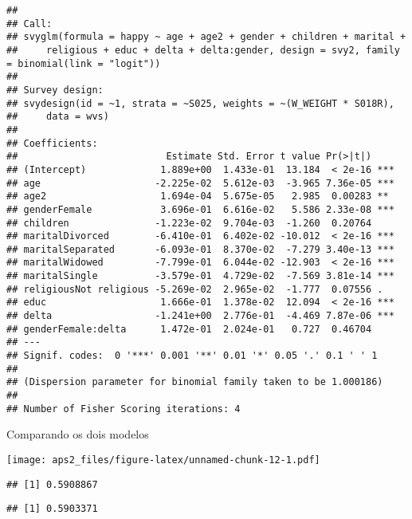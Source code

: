 \documentclass[
]{article}
\newenvironment{Shaded}{\begin{snugshade}}{\end{snugshade}}
\newcommand{\AttributeTok}[1]{\textcolor[rgb]{0.77,0.63,0.00}{#1}}
\newcommand{\FunctionTok}[1]{\textcolor[rgb]{0.00,0.00,0.00}{#1}}
\newcommand{\NormalTok}[1]{#1}
\newcommand{\OtherTok}[1]{\textcolor[rgb]{0.56,0.35,0.01}{#1}}
\newcommand{\SpecialCharTok}[1]{\textcolor[rgb]{0.00,0.00,0.00}{#1}}
\begin{document}
\begin{verbatim}
## 
## Call:
## svyglm(formula = happy ~ age + age2 + gender + children + marital + 
##     religious + educ + delta + delta:gender, design = svy2, family = binomial(link = "logit"))
## 
## Survey design:
## svydesign(id = ~1, strata = ~S025, weights = ~(W_WEIGHT * S018R), 
##     data = wvs)
## 
## Coefficients:
##                          Estimate Std. Error t value Pr(>|t|)    
## (Intercept)             1.889e+00  1.433e-01  13.184  < 2e-16 ***
## age                    -2.225e-02  5.612e-03  -3.965 7.36e-05 ***
## age2                    1.694e-04  5.675e-05   2.985  0.00283 ** 
## genderFemale            3.696e-01  6.616e-02   5.586 2.33e-08 ***
## children               -1.223e-02  9.704e-03  -1.260  0.20764    
## maritalDivorced        -6.410e-01  6.402e-02 -10.012  < 2e-16 ***
## maritalSeparated       -6.093e-01  8.370e-02  -7.279 3.40e-13 ***
## maritalWidowed         -7.799e-01  6.044e-02 -12.903  < 2e-16 ***
## maritalSingle          -3.579e-01  4.729e-02  -7.569 3.81e-14 ***
## religiousNot religious -5.269e-02  2.965e-02  -1.777  0.07556 .  
## educ                    1.666e-01  1.378e-02  12.094  < 2e-16 ***
## delta                  -1.241e+00  2.776e-01  -4.469 7.87e-06 ***
## genderFemale:delta      1.472e-01  2.024e-01   0.727  0.46704    
## ---
## Signif. codes:  0 '***' 0.001 '**' 0.01 '*' 0.05 '.' 0.1 ' ' 1
## 
## (Dispersion parameter for binomial family taken to be 1.000186)
## 
## Number of Fisher Scoring iterations: 4
\end{verbatim}

Comparando os dois modelos

\begin{Shaded}
\end{Shaded}

\texttt{[image: aps2\_files/figure-latex/unnamed-chunk-12-1.pdf]}

\begin{Shaded}
\end{Shaded}

\begin{verbatim}
## [1] 0.5908867
\end{verbatim}

\begin{Shaded}
\end{Shaded}

\begin{verbatim}
## [1] 0.5903371
\end{verbatim}
\end{document}
